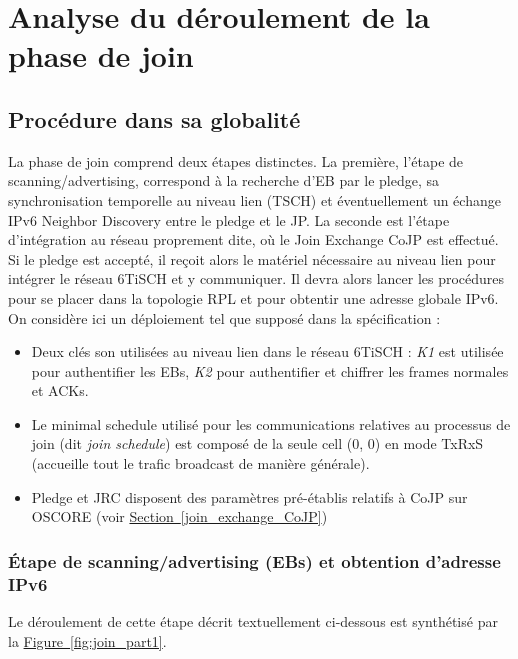 \documentclass[]{report}
\newcommand{\wordlink}[2]{\hyperref[#2]{#1~\ref{#2}}}
\begin{document}
\newpage

\section{Analyse du déroulement de la phase de join}
\label{join_phase_analysis}

\subsection{Procédure dans sa globalité}
La phase de join comprend deux étapes distinctes. La première, l'étape de scanning/advertising, correspond à la recherche d'EB par le pledge, sa synchronisation temporelle au niveau lien (TSCH) et éventuellement un échange IPv6 Neighbor Discovery entre le pledge et le JP. La seconde est l'étape d'intégration au réseau proprement dite, où le Join Exchange CoJP est effectué. Si le pledge est accepté, il reçoit alors le matériel nécessaire au niveau lien pour intégrer le réseau 6TiSCH et y communiquer. Il devra alors lancer les procédures pour se placer dans la topologie RPL et pour obtentir une adresse globale IPv6.\\

On considère ici un déploiement tel que supposé dans la spécification \cite{rfc8180} : 
\begin{itemize}[label=$\bullet$]
\item Deux clés son utilisées au niveau lien dans le réseau 6TiSCH : \textit{K1} est utilisée pour authentifier les EBs, \textit{K2} pour authentifier et chiffrer les frames normales et ACKs.
\item Le minimal schedule utilisé pour les communications relatives au processus de join (dit \textit{join schedule}) est composé de la seule cell (0, 0) en mode TxRxS (accueille tout le trafic broadcast de manière générale).
\item Pledge et JRC disposent des paramètres pré-établis relatifs à CoJP sur OSCORE (voir \wordlink{Section}{join_exchange_CoJP})
\end{itemize}

\subsubsection{Étape de scanning/advertising (EBs) et obtention d'adresse IPv6}
\label{global_EB}

Le déroulement de cette étape décrit textuellement ci-dessous est synthétisé par la \wordlink{Figure}{fig:join_part1}.\\
\end{document}
